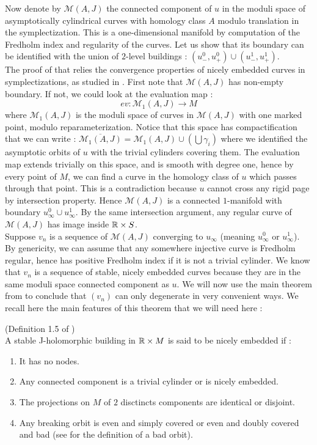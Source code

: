 \documentclass[../main.tex]{subfiles}
\begin{document}
Now denote by $\mathcal{M}(A,J)$ the connected component of $u$ in the moduli space of asymptotically cylindrical curves with homology class $A$ modulo translation in the symplectization. This is a one-dimensional manifold by computation of the Fredholm index and regularity of the curves. Let us show that its boundary can be identified with the union of $2$-level buildings : $(u_-^0,u_+^0)\cup(u_-^1,u_+^1)$.\\ 

The proof of that relies the convergence properties of nicely embedded curves in symplectizations, as studied in \cite{wendl_compactness_2008}. First note that $\mathcal{M}(A,J)$ has non-empty boundary. If not, we could look at the evaluation map : $$ev : \mathcal{M}_1(A,J)\rightarrow M$$ where $\mathcal{M}_1(A,J)$ is the moduli space of curves in $\mathcal{M}(A,J)$ with one marked point, modulo reparameterization. Notice that this space has compactification that we can write : $\overline{\mathcal{M}_1(A,J)} = \mathcal{M}_1(A,J)\cup (\bigcup\gamma_i)$ where we identified the asymptotic orbits of $u$ with the trivial cylinders covering them. The evaluation map extends trivially on this space, and is smooth with degree one, hence by every point of $M$, we can find a curve in the homology class of $u$ which passes through that point. This is a contradiction because $u$ cannot cross any rigid page by intersection property. Hence $\mathcal{M}(A,J)$ is a connected $1$-manifold with boundary $u_\infty^0\cup u^1_\infty$. By the same intersection argument, any regular curve of $\mathcal{M}(A,J)$ has image inside $\mathbb{R}\times S$.\\

Suppose $v_n$ is a sequence of $\mathcal{M}(A,J)$ converging to $u_\infty$ (meaning $u_\infty^0$ or $u_\infty^1$). By genericity, we can assume that any somewhere injective curve is Fredholm regular, hence has positive Fredholm index if it is not a trivial cylinder. We know that $v_n$ is a sequence of stable, nicely embedded curves because they are in the same moduli space connected component as $u$. We will now use the main theorem from \cite{wendl_compactness_2008} to conclude that $(v_n)$ can only degenerate in very convenient ways. We recall here the main features of this theorem that we will need here :

\begin{definition}{(Definition 1.5 of \cite{wendl_compactness_2008})\\}
    A stable J-holomorphic building in $\mathbb{R}\times M$ is said to be nicely embedded if :
    \begin{enumerate}
        \item It has no nodes.
        \item Any connected component is a trivial cylinder or is nicely embedded.
        \item The projections on $M$ of $2$ disctincts components are identical or disjoint.
        \item Any breaking orbit is even and simply covered or even and doubly covered and bad (see \cite{} for the definition of a bad orbit).
    \end{enumerate}
\end{definition}
\end{document}
